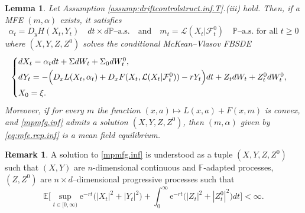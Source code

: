 \documentclass[11pt,reqno]{amsart}
\numberwithin{equation}{section}
\newtheorem{lemma}[theorem]{Lemma}
\theoremstyle{definition}
\newtheorem{remark}[theorem]{Remark}
\def\E{{\mathbb E}}
\def\R{{\mathbb R}}
\def\P{{\mathcal P}}
\def\F{{\mathcal F}}
\newcommand{\sL}{\mathcal{L}}
\newcommand{\sF}{\mathcal{F}}
\def \E{\mathbb{E}}
\def \F{\mathbb{F}}
\def \P{\mathbb{P}}
\def \R{\mathbb{R}}
\def \e{\mathrm{e}}
\begin{document}
\begin{lemma}
  \label{lem.existence.inf}
Let Assumption \ref{assump:driftcontrolstruct.inf.T}.(iii) hold.
    Then, if a MFE $(m,\alpha)$ exists, it satisfies
  \begin{equation}
  \label{eq:mfe.rep.inf}
    \alpha_t = D_yH(X_t, Y_t)\quad dt\times d\P\text{--a.s.}\quad \mathrm{and}\quad m_t = \sL(X_t|\sF^0_t) \quad \P\text{--a.s. for all } t\ge0
  \end{equation}
  where $(X,Y,Z,Z^0)$ solves the conditional McKean--Vlasov FBSDE
\begin{align} \label{mpmfg.inf}
\begin{cases} \vspace{.1cm}
  dX_t = \alpha_t dt + \Sigma dW_t + \Sigma_0 dW_t^0,  \\ \vspace{.1cm}
  dY_t = - \Big(D_x L(X_t, \alpha_t) + D_x F(X_t, \sL(X_t | \sF_t^0)) - rY_t \Big) dt + Z_t  dW_t + Z_t^{0}  dW_t^0, \\
  X_0 = \xi. 
\end{cases}
\end{align}
Moreover, if for every $m$ the function $(x,a)\mapsto L(x,a) + F(x,m)$
 is convex, and \eqref{mpmfg.inf} admits a solution $(X,Y, Z,Z^0)$, then $(m,\alpha)$ given by \eqref{eq:mfe.rep.inf} is a mean field equilibrium.
\end{lemma}
\begin{remark}
  A solution to \eqref{mpmfg.inf} is understood as a tuple $(X, Y, Z,Z^0)$ such that $(X,Y)$ are $n$-dimensional continuous and $\F$-adapted processes, $(Z,Z^0)$ are $n\times d$--dimensional progressive processes such that
  \begin{equation*}
    \E\bigg[\sup_{t\in[0,\infty)}\e^{-rt}\big(|X_t|^2+|Y_t|^2\big) + \int_0^\infty\e^{-rt}\big(|Z_t|^2 + |Z^0_t|^2\big)dt\bigg]<\infty.
  \end{equation*}
\end{remark}
\end{document}
